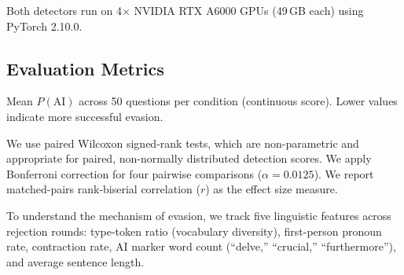 Both detectors run on 4$\times$ NVIDIA RTX A6000 GPUs (49\,GB each) using PyTorch 2.10.0.

\subsection{Evaluation Metrics}
\label{sec:metrics}

Mean $P(\text{AI})$ across 50 questions per condition (continuous score). Lower values indicate more successful evasion.

We use paired Wilcoxon signed-rank tests, which are non-parametric and appropriate for paired, non-normally distributed detection scores.
We apply Bonferroni correction for four pairwise comparisons ($\alpha = 0.0125$).
We report matched-pairs rank-biserial correlation ($r$) as the effect size measure.

To understand the mechanism of evasion, we track five linguistic features across rejection rounds: type-token ratio (vocabulary diversity), first-person pronoun rate, contraction rate, AI marker word count (\eg ``delve,'' ``crucial,'' ``furthermore''), and average sentence length.
